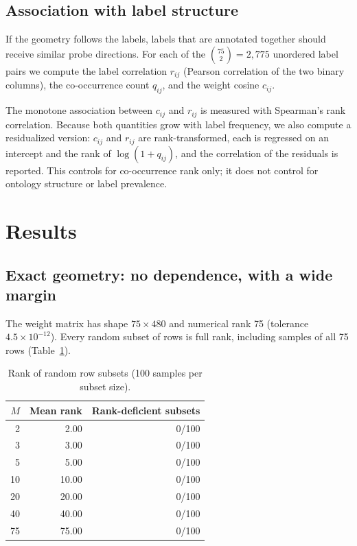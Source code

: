 \documentclass[11pt,a4paper]{article}
\begin{document}
\subsection{Association with label structure}

If the geometry follows the labels, labels that are annotated together should
receive similar probe directions. For each of the $\binom{75}{2} = 2{,}775$
unordered label pairs we compute the label correlation $r_{ij}$ (Pearson
correlation of the two binary columns), the co-occurrence count $q_{ij}$, and the
weight cosine $c_{ij}$.

The monotone association between $c_{ij}$ and $r_{ij}$ is measured with Spearman's
rank correlation. Because both quantities grow with label frequency, we also
compute a residualized version: $c_{ij}$ and $r_{ij}$ are rank-transformed, each is
regressed on an intercept and the rank of $\log(1+q_{ij})$, and the correlation of
the residuals is reported. This controls for co-occurrence rank only; it does not
control for ontology structure or label prevalence.

\section{Results}

\subsection{Exact geometry: no dependence, with a wide margin}

The weight matrix has shape $75 \times 480$ and numerical rank 75 (tolerance
$4.5 \times 10^{-12}$). Every random subset of rows is full rank, including
samples of all 75 rows (Table~\ref{tab:subsets}).

\begin{table}[H]
\centering
\caption{Rank of random row subsets (100 samples per subset size).}
\label{tab:subsets}
\begin{tabular}{rrr}
\toprule
$M$ & Mean rank & Rank-deficient subsets \\
\midrule
2  & 2.00  & 0/100 \\
3  & 3.00  & 0/100 \\
5  & 5.00  & 0/100 \\
10 & 10.00 & 0/100 \\
20 & 20.00 & 0/100 \\
40 & 40.00 & 0/100 \\
75 & 75.00 & 0/100 \\
\bottomrule
\end{tabular}
\end{table}
\end{document}
